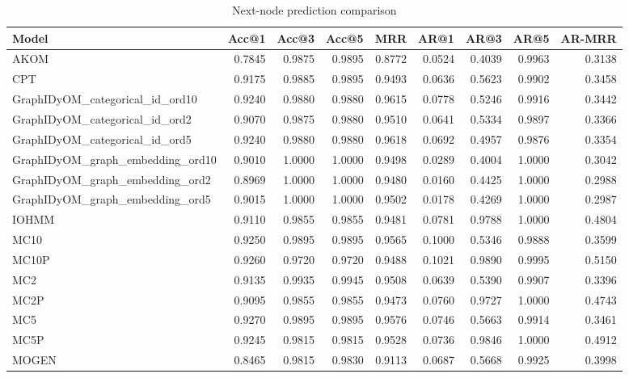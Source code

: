 \begin{table}
\caption{Next-node prediction comparison}
\label{tab:comparison}
\begin{tabular}{lrrrrrrrr}
\toprule
Model & Acc@1 & Acc@3 & Acc@5 & MRR & AR@1 & AR@3 & AR@5 & AR-MRR \\
\midrule
AKOM & 0.7845 & 0.9875 & 0.9895 & 0.8772 & 0.0524 & 0.4039 & 0.9963 & 0.3138 \\
CPT & 0.9175 & 0.9885 & 0.9895 & 0.9493 & 0.0636 & 0.5623 & 0.9902 & 0.3458 \\
GraphIDyOM_categorical_id_ord10 & 0.9240 & 0.9880 & 0.9880 & 0.9615 & 0.0778 & 0.5246 & 0.9916 & 0.3442 \\
GraphIDyOM_categorical_id_ord2 & 0.9070 & 0.9875 & 0.9880 & 0.9510 & 0.0641 & 0.5334 & 0.9897 & 0.3366 \\
GraphIDyOM_categorical_id_ord5 & 0.9240 & 0.9880 & 0.9880 & 0.9618 & 0.0692 & 0.4957 & 0.9876 & 0.3354 \\
GraphIDyOM_graph_embedding_ord10 & 0.9010 & 1.0000 & 1.0000 & 0.9498 & 0.0289 & 0.4004 & 1.0000 & 0.3042 \\
GraphIDyOM_graph_embedding_ord2 & 0.8969 & 1.0000 & 1.0000 & 0.9480 & 0.0160 & 0.4425 & 1.0000 & 0.2988 \\
GraphIDyOM_graph_embedding_ord5 & 0.9015 & 1.0000 & 1.0000 & 0.9502 & 0.0178 & 0.4269 & 1.0000 & 0.2987 \\
IOHMM & 0.9110 & 0.9855 & 0.9855 & 0.9481 & 0.0781 & 0.9788 & 1.0000 & 0.4804 \\
MC10 & 0.9250 & 0.9895 & 0.9895 & 0.9565 & 0.1000 & 0.5346 & 0.9888 & 0.3599 \\
MC10P & 0.9260 & 0.9720 & 0.9720 & 0.9488 & 0.1021 & 0.9890 & 0.9995 & 0.5150 \\
MC2 & 0.9135 & 0.9935 & 0.9945 & 0.9508 & 0.0639 & 0.5390 & 0.9907 & 0.3396 \\
MC2P & 0.9095 & 0.9855 & 0.9855 & 0.9473 & 0.0760 & 0.9727 & 1.0000 & 0.4743 \\
MC5 & 0.9270 & 0.9895 & 0.9895 & 0.9576 & 0.0746 & 0.5663 & 0.9914 & 0.3461 \\
MC5P & 0.9245 & 0.9815 & 0.9815 & 0.9528 & 0.0736 & 0.9846 & 1.0000 & 0.4912 \\
MOGEN & 0.8465 & 0.9815 & 0.9830 & 0.9113 & 0.0687 & 0.5668 & 0.9925 & 0.3998 \\
\bottomrule
\end{tabular}
\end{table}
